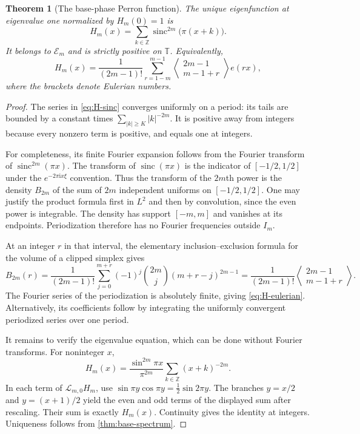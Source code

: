 \documentclass[11pt,a4paper]{article}
\numberwithin{equation}{section}
\newtheorem{theorem}{Theorem}[section]
\theoremstyle{definition}
\theoremstyle{remark}
\newcommand{\TT}{\mathbb T}
\newcommand{\ZZ}{\mathbb Z}
\newcommand{\ii}{\mathrm i}
\newcommand{\Lop}{\mathcal L}
\newcommand{\sinc}{\operatorname{sinc}}
\newcommand{\eul}[2]{\left\langle\!\begin{matrix}#1\\#2\end{matrix}\!\right\rangle}
\begin{document}
\begin{theorem}[The base-phase Perron function]
\label{thm:H}
The unique eigenfunction at eigenvalue one normalized by $H_m(0)=1$ is
\begin{equation}
 H_m(x)=\sum_{k\in\ZZ}\sinc^{2m}\!\bigl(\pi(x+k)\bigr).
 \label{eq:H-sinc}
\end{equation}
It belongs to $\mathcal E_m$ and is strictly positive on $\TT$.
Equivalently,
\begin{equation}
 H_m(x)=\frac1{(2m-1)!}
 \sum_{r=1-m}^{m-1}\eul{2m-1}{m-1+r}e(rx),
 \label{eq:H-eulerian}
\end{equation}
where the brackets denote Eulerian numbers.
\end{theorem}
\begin{proof}
The series in \cref{eq:H-sinc} converges uniformly on a period: its tails
are bounded by a constant times $\sum_{|k|\geq K}|k|^{-2m}$.
It is positive away from integers because every nonzero term is positive,
and equals one at integers.

For completeness, its finite Fourier expansion follows from the Fourier
transform of $\sinc^{2m}(\pi x)$. The transform of $\sinc(\pi x)$ is the
indicator of $[-1/2,1/2]$ under the $e^{-2\pi\ii x\xi}$ convention.
Thus the transform of the $2m$th power is the density $B_{2m}$ of the
sum of $2m$ independent uniforms on $[-1/2,1/2]$. One may justify the
product formula first in $L^2$ and then by convolution, since the even
power is integrable. The density has support $[-m,m]$ and vanishes
at its endpoints. Periodization therefore has no Fourier frequencies
outside $I_m$.

At an integer $r$ in that interval, the elementary inclusion--exclusion
formula for the volume of a clipped simplex gives
\[
 B_{2m}(r)=\frac1{(2m-1)!}
 \sum_{j=0}^{m+r}(-1)^j\binom{2m}{j}(m+r-j)^{2m-1}
 =\frac1{(2m-1)!}\eul{2m-1}{m-1+r}.
\]
The Fourier series of the periodization is absolutely finite, giving
\cref{eq:H-eulerian}. Alternatively, its coefficients follow by integrating
the uniformly convergent periodized series over one period.

It remains to verify the eigenvalue equation, which can be done without
Fourier transforms. For noninteger $x$,
\[
 H_m(x)=\frac{\sin^{2m}\pi x}{\pi^{2m}}
 \sum_{k\in\ZZ}(x+k)^{-2m}.
\]
In each term of $\Lop_{m,0}H_m$, use
$\sin\pi y\cos\pi y=\tfrac12\sin2\pi y$.
The branches $y=x/2$ and $y=(x+1)/2$ yield the even and odd terms of
the displayed sum after rescaling. Their sum is exactly $H_m(x)$.
Continuity gives the identity at integers. Uniqueness follows from
\cref{thm:base-spectrum}.
\end{proof}
\end{document}
